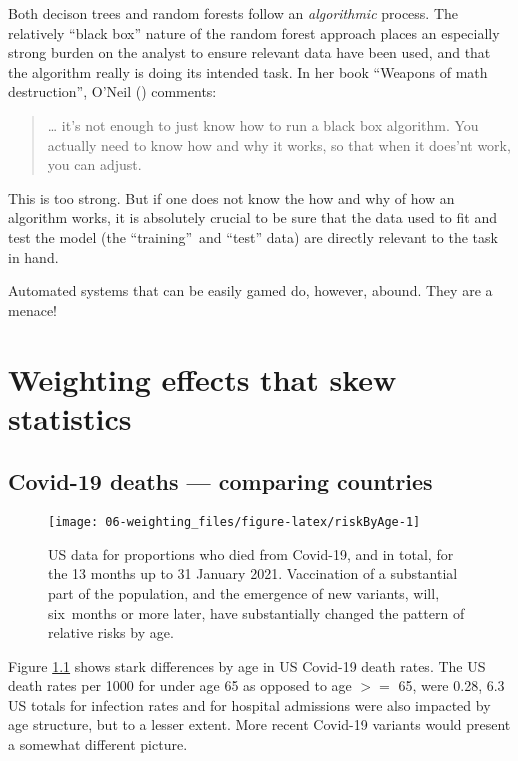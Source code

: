 \documentclass[
  10ptls,
  b5paper]{book}
\begin{document}
Both decison trees and random forests follow an \emph{algorithmic} process. The relatively ``black box'' nature of the random forest approach places an especially strong burden on the analyst to ensure relevant data have been used, and that the algorithm really is doing its intended task. In her book ``Weapons of math destruction'', O'Neil () comments:

\begin{quote}
\ldots{} it's not enough to just know how to run a black box algorithm. You actually need to know how and why it works, so that when it does'nt work, you can adjust.
\end{quote}

This is too strong. But if one does not know the how and why of how an algorithm works, it is absolutely crucial to be sure that the data used to fit and test the model (the ``training''~and ``test'' data) are directly relevant to the task in hand.

Automated systems that can be easily gamed do, however, abound. They are a menace!

\chapter{Weighting effects that skew statistics}\label{sec:yule1}

\section{Covid-19 deaths --- comparing countries}\label{covid-19-deaths-comparing-countries}

\begin{figure}[H]

{\centering \texttt{[image: 06-weighting\_files/figure-latex/riskByAge-1]} 

}

\caption{US data for proportions who died from Covid-19, and in total,
for the 13 months up to 31 January 2021. Vaccination of a substantial 
part of the population, and the emergence of new variants, will,
six months or more later, have substantially changed the pattern
of relative risks by age.}\label{fig:riskByAge}
\end{figure}

Figure \ref{fig:riskByAge} shows stark differences by age in US Covid-19 death rates. The US death rates per 1000 for under age 65 as opposed to age \(>=\) 65, were 0.28, 6.3 US totals for infection rates and for hospital admissions were also impacted by age structure, but to a lesser extent. More recent Covid-19 variants would present a somewhat different picture.
\end{document}
